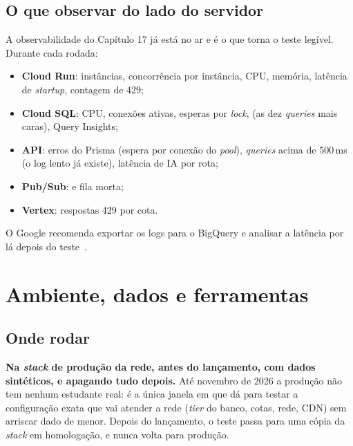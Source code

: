 \documentclass[11pt, a4paper, oneside, openany]{report}
\begin{document}
\section{O que observar do lado do servidor}

A observabilidade do Capítulo 17 já está no ar e é o que torna o teste legível.
Durante cada rodada:

\begin{itemize}
  \item \textbf{Cloud Run}: instâncias, concorrência por instância, CPU,
    memória, latência de \emph{startup}, contagem de 429;
  \item \textbf{Cloud SQL}: CPU, conexões ativas, esperas por \emph{lock},
     (as dez \emph{queries} mais caras), Query
    Insights;
  \item \textbf{API}: erros  do Prisma (espera por conexão do
    \emph{pool}), \emph{queries} acima de 500\,ms (o log lento já existe),
    latência de IA por rota;
  \item \textbf{Pub/Sub}:  e fila morta;
  \item \textbf{Vertex}: respostas 429 por cota.
\end{itemize}

O Google recomenda exportar os logs para o BigQuery e analisar a latência por
lá depois do teste~\cite{gcrloadtest}.

\chapter{Ambiente, dados e ferramentas}
\label{cap:ambiente}

\section{Onde rodar}

\begin{decisao}
\textbf{Na \emph{stack} de produção da rede, antes do lançamento, com dados
sintéticos, e apagando tudo depois.} Até novembro de 2026 a produção não tem
nenhum estudante real: é a única janela em que dá para testar a configuração
exata que vai atender a rede (\emph{tier} do banco, cotas, rede, CDN) sem
arriscar dado de menor. Depois do lançamento, o teste passa para uma cópia da
\emph{stack} em homologação, e nunca volta para produção.
\end{decisao}
\end{document}
